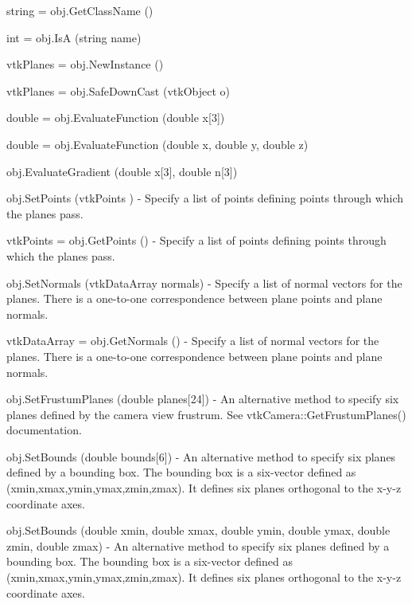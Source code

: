 \begin{DoxyItemize}
\item {\ttfamily string = obj.\-Get\-Class\-Name ()}  
\item {\ttfamily int = obj.\-Is\-A (string name)}  
\item {\ttfamily vtk\-Planes = obj.\-New\-Instance ()}  
\item {\ttfamily vtk\-Planes = obj.\-Safe\-Down\-Cast (vtk\-Object o)}  
\item {\ttfamily double = obj.\-Evaluate\-Function (double x\mbox{[}3\mbox{]})}  
\item {\ttfamily double = obj.\-Evaluate\-Function (double x, double y, double z)}  
\item {\ttfamily obj.\-Evaluate\-Gradient (double x\mbox{[}3\mbox{]}, double n\mbox{[}3\mbox{]})}  
\item {\ttfamily obj.\-Set\-Points (vtk\-Points )} -\/ Specify a list of points defining points through which the planes pass.  
\item {\ttfamily vtk\-Points = obj.\-Get\-Points ()} -\/ Specify a list of points defining points through which the planes pass.  
\item {\ttfamily obj.\-Set\-Normals (vtk\-Data\-Array normals)} -\/ Specify a list of normal vectors for the planes. There is a one-\/to-\/one correspondence between plane points and plane normals.  
\item {\ttfamily vtk\-Data\-Array = obj.\-Get\-Normals ()} -\/ Specify a list of normal vectors for the planes. There is a one-\/to-\/one correspondence between plane points and plane normals.  
\item {\ttfamily obj.\-Set\-Frustum\-Planes (double planes\mbox{[}24\mbox{]})} -\/ An alternative method to specify six planes defined by the camera view frustrum. See vtk\-Camera\-::\-Get\-Frustum\-Planes() documentation.  
\item {\ttfamily obj.\-Set\-Bounds (double bounds\mbox{[}6\mbox{]})} -\/ An alternative method to specify six planes defined by a bounding box. The bounding box is a six-\/vector defined as (xmin,xmax,ymin,ymax,zmin,zmax). It defines six planes orthogonal to the x-\/y-\/z coordinate axes.  
\item {\ttfamily obj.\-Set\-Bounds (double xmin, double xmax, double ymin, double ymax, double zmin, double zmax)} -\/ An alternative method to specify six planes defined by a bounding box. The bounding box is a six-\/vector defined as (xmin,xmax,ymin,ymax,zmin,zmax). It defines six planes orthogonal to the x-\/y-\/z coordinate axes.  

\end{DoxyItemize}
